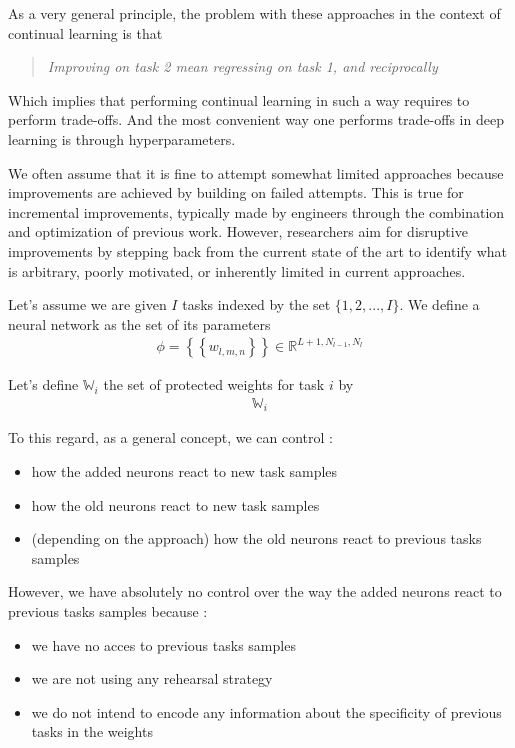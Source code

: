 \documentclass{article}
\begin{document}
As a very general principle, the problem with these approaches in the context of continual learning is that
\begin{quote}
    \itshape
    \centering
    Improving on task 2 mean regressing on task 1, and reciprocally
\end{quote}

\noindent
Which implies that performing continual learning in such a way requires to perform trade-offs. And the most convenient way one performs trade-offs in deep learning is through hyperparameters.

\vspace{0.5cm}

\noindent
We often assume that it is fine to attempt somewhat limited approaches because improvements are achieved by building on failed attempts. This is true for incremental improvements, typically made by engineers through the combination and optimization of previous work. However, researchers aim for disruptive improvements by stepping back from the current state of the art to identify what is arbitrary, poorly motivated, or inherently limited in current approaches.

\vspace{0.5cm}

\noindent
Let's assume we are given $I$ tasks indexed by the set $\{1,2,...,I\}$. We define a neural network as the set of its parameters
\begin{align}
    \phi = \left\{\left\{w_{l,m,n}\right\}\right\} \in \mathbb{R}^{L+1,N_{l-1},N_{l}}
\end{align}

Let's define $\mathbb{W}_i$ the set of protected weights for task $i$ by 
\begin{align}
    \mathbb{W}_i
\end{align}

\vspace{0.5cm}

\noindent
To this regard, as a general concept, we can control :
\begin{itemize}
    \item how the added neurons react to new task samples
    \item how the old neurons react to new task samples
    \item (depending on the approach) how the old neurons react to previous tasks samples
\end{itemize}

However, we have absolutely no control over the way the added neurons react to previous tasks samples because :
\begin{itemize}
    \item we have no acces to previous tasks samples
    \item we are not using any rehearsal strategy
    \item we do not intend to encode any information about the specificity of previous tasks in the weights 
\end{itemize}
\end{document}
